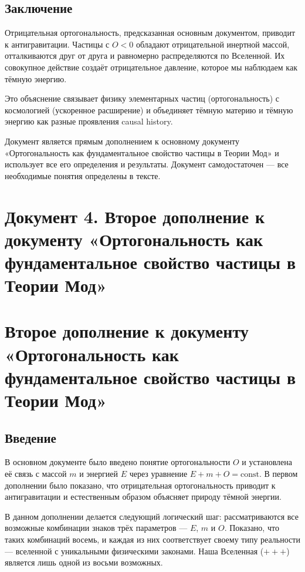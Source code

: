 \documentclass[12pt,a4paper]{article}
\begin{document}
\subsection{Заключение}
Отрицательная ортогональность, предсказанная основным документом, приводит к антигравитации. Частицы с $O < 0$ обладают отрицательной инертной массой, отталкиваются друг от друга и равномерно распределяются по Вселенной. Их совокупное действие создаёт отрицательное давление, которое мы наблюдаем как тёмную энергию.

Это объяснение связывает физику элементарных частиц (ортогональность) с космологией (ускоренное расширение) и объединяет тёмную материю и тёмную энергию как разные проявления causal history.

Документ является прямым дополнением к основному документу «Ортогональность как фундаментальное свойство частицы в Теории Мод» и использует все его определения и результаты. Документ самодостаточен --- все необходимые понятия определены в тексте.


\newpage
\section*{Документ 4. Второе дополнение к документу «Ортогональность как фундаментальное свойство частицы в Теории Мод»}

\section{Второе дополнение к документу «Ортогональность как фундаментальное свойство частицы в Теории Мод»}

\subsection{Введение}
В основном документе было введено понятие ортогональности $O$ и установлена её связь с массой $m$ и энергией $E$ через уравнение $E + m + O = \text{const}$. В первом дополнении было показано, что отрицательная ортогональность приводит к антигравитации и естественным образом объясняет природу тёмной энергии.

В данном дополнении делается следующий логический шаг: рассматриваются все возможные комбинации знаков трёх параметров --- $E$, $m$ и $O$. Показано, что таких комбинаций восемь, и каждая из них соответствует своему типу реальности --- вселенной с уникальными физическими законами. Наша Вселенная ($+ + +$) является лишь одной из восьми возможных.
\end{document}
